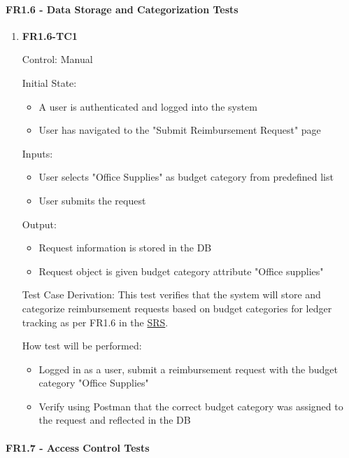 \documentclass[12pt, titlepage]{article}
\begin{document}
\paragraph{FR1.6 - Data Storage and Categorization Tests}

\begin{enumerate}
    \item{\textbf{FR1.6-TC1}}
    
    Control: Manual
    
    Initial State:
    \begin{itemize}
        \item A user is authenticated and logged into the system
        \item User has navigated to the "Submit Reimbursement Request" page
    \end{itemize}
    
    Inputs: 
    \begin{itemize}
        \item User selects "Office Supplies" as budget category from predefined list
        \item User submits the request
    \end{itemize}
    
    Output: 
    \begin{itemize}
        \item Request information is stored in the DB
        \item Request object is given budget category attribute "Office supplies"
    \end{itemize}
    
    Test Case Derivation: This test verifies that the system will store and categorize reimbursement requests based on budget categories for ledger tracking as per FR1.6 in the \href{https://shorturl.at/FdAgR}{SRS}.
    
    How test will be performed:
    \begin{itemize}
        \item Logged in as a user, submit a reimbursement request with the budget category "Office Supplies"
        \item Verify using Postman that the correct budget category was assigned to the request and reflected in the DB
    \end{itemize}
\end{enumerate}

\paragraph{FR1.7 - Access Control Tests}
\end{document}
